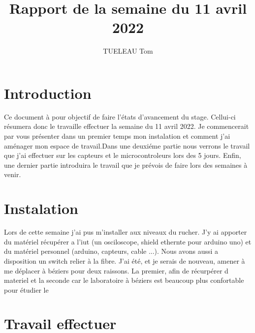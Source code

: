 \documentclass[5pt]{article}
\title{Rapport de la semaine du 11 avril 2022}
\author{TUELEAU Tom}
\begin{document}
\maketitle
\section{Introduction}
Ce document à pour objectif de faire l'états d'avancement du stage. Cellui-ci résumera donc le travaille effectuer la semaine du 11 avril 2022. Je commencerait par vous présenter dans un premier temps mon instalation et comment j'ai aménager mon espace de travail.Dans une deuxiéme partie nous verrons le travail que j'ai effectuer sur les capteurs et le microcontroleurs lors des 5 jours. Enfin, une dernier partie introduira le travail que je prévois de faire lors des semaines à venir. 
\section{Instalation}
Lors de cette semaine j'ai pus m'installer aux niveaux du rucher. J'y ai apporter du matériel récupérer a l'iut (un osciloscope, shield ethernte pour arduino uno) et du matériel personnel (arduino, capteurs, cable ...). Nous avons aussi a disposition un switch relier à la fibre. J'ai été, et je serais de nouveau, amener à me déplacer à béziers pour deux raissons. La premier, afin de récurpérer d materiel et la seconde car le laboratoire à béziers est beaucoup plus confortable pour étudier le 
\section{Travail effectuer}
\end{document}

